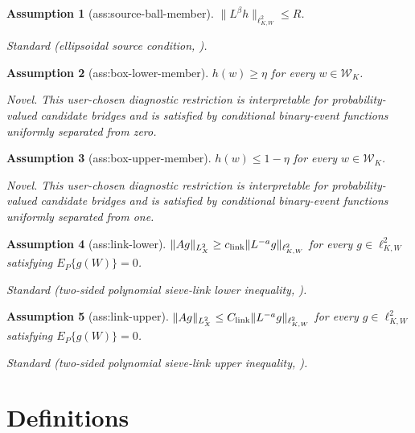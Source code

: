 \documentclass{article}
\newtheorem{assumption}{Assumption}
\begin{document}
\begin{assumption}[ass:source-ball-member]\label{ass:source-ball-member}
\(\|L^\beta h\|_{\ell^2_{K,W}}\le R\).
\par\smallskip\noindent\emph{Standard} (ellipsoidal source condition, \cite{MarteauSapatinas2017}).
\end{assumption}

\begin{assumption}[ass:box-lower-member]\label{ass:box-lower-member}
\(h(w)\ge\eta\) for every \(w\in\mathcal W_K\).
\par\smallskip\noindent\emph{Novel.} This user-chosen diagnostic restriction is interpretable for probability-valued candidate bridges and is satisfied by conditional binary-event functions uniformly separated from zero.
\end{assumption}

\begin{assumption}[ass:box-upper-member]\label{ass:box-upper-member}
\(h(w)\le1-\eta\) for every \(w\in\mathcal W_K\).
\par\smallskip\noindent\emph{Novel.} This user-chosen diagnostic restriction is interpretable for probability-valued candidate bridges and is satisfied by conditional binary-event functions uniformly separated from one.
\end{assumption}

\begin{assumption}[ass:link-lower]\label{ass:link-lower}
\(\|Ag\|_{L^2_X}\ge c_{\rm link}\|L^{-a}g\|_{\ell^2_{K,W}}\) for every \(g\in\ell^2_{K,W}\) satisfying \(E_P\{g(W)\}=0\).
\par\smallskip\noindent\emph{Standard} (two-sided polynomial sieve-link lower inequality, \cite{BreunigChen2024}).
\end{assumption}

\begin{assumption}[ass:link-upper]\label{ass:link-upper}
\(\|Ag\|_{L^2_X}\le C_{\rm link}\|L^{-a}g\|_{\ell^2_{K,W}}\) for every \(g\in\ell^2_{K,W}\) satisfying \(E_P\{g(W)\}=0\).
\par\smallskip\noindent\emph{Standard} (two-sided polynomial sieve-link upper inequality, \cite{BreunigChen2024}).
\end{assumption}

\section{Definitions}
\end{document}
